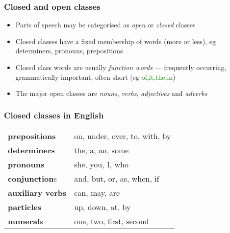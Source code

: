 \begin{frame}[fragile]\frametitle{Closed and open classes}
  \begin{itemize}
  \item Parts of speech may be categorised as \emph{open} or
    \emph{closed} classes
  \item Closed classes have a fixed membership of words (more or
    less), eg determiners, pronouns, prepositions
  \item Closed class words are usually \emph{function words} ---
    frequently occurring, grammatically important, often short (eg
    \textcolor{green}{of,it,the,in})
  \item The major open classes are \emph{nouns}, \emph{verbs},
    \emph{adjectives} and \emph{adverbs}
  \end{itemize}
\end{frame}

\begin{frame}[fragile]\frametitle{Closed classes in English}
  \textcolor{black}{
  \begin{tabular}{ll}
  \textbf{prepositions} & on, under, over, to, with, by\\
  \textbf{determiners} & the, a, an, some\\
  \textbf{pronouns} & she, you, I, who\\
  \textbf{conjunction}s & and, but, or, as, when, if\\
  \textbf{auxiliary verbs} & can, may, are\\
  \textbf{particles} & up, down, at, by\\
  \textbf{numeral}s & one, two, first, second\\
  \end{tabular}}
\end{frame}


